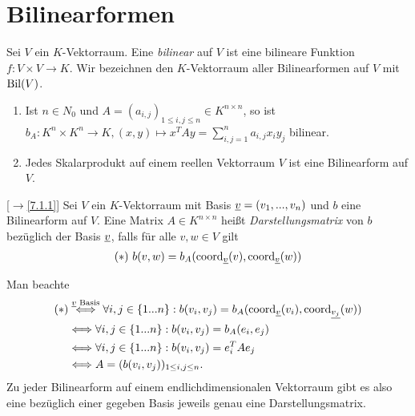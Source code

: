 \documentclass[../../main.tex]{subfiles}
\begin{document}
\section{Bilinearformen}

\begin{df}\label{13.3.1}
Sei $V$ ein $K$-Vektorraum. Eine \emph{bilinear} auf $V$ ist eine bilineare Funktion $f: V\times V\to K$. Wir bezeichnen den $K$-Vektorraum aller Bilinearformen auf $V$ mit $\operatorname{Bil}(V)$.
\end{df}

\begin{bsp}\label{13.3.2}
\begin{enumerate}[\normalfont(a)]
\item Ist $n\in N_0$ und $A=(a_{i,j})_{1\le i,j\le n}\in K^{n\times n}$, so ist $b_A: K^n\times K^n\to K, (x,y)\mapsto x^TAy=\sum_{i,j=1}^na_{i,j}x_iy_j$ bilinear.
\item Jedes Skalarprodukt auf einem reellen Vektorraum $V$ ist eine Bilinearform auf $V$.
\end{enumerate}
\end{bsp}
	
\begin{df}\label{13.3.3} 
[$\to$\ref{7.1.1}] Sei $V$ ein $K$-Vektorraum mit Basis ${\underline v}=(v_1,...,v_n)$ und $b$ eine Bilinearform auf $V$. Eine Matrix $A\in K^{n\times n}$ heißt \emph{Darstellungsmatrix} von $b$ bezüglich der Basis ${\underline v}$, falls für alle $v,w\in V$ gilt
\begin{align*}
(*)\ b(v,w)=b_A(\operatorname{coord}_{{\underline v}}(v),\operatorname{coord}_{{\underline v}}(w))
\end{align*}
\end{df}

\begin{bem}\label{13.3.4} 
Man beachte
\begin{align*}
(*)&\stackrel{\underline{v}\text{ Basis}}{\Longleftrightarrow} \forall i,j\in \{1...n\}: b(v_i,v_j)=b_A(\operatorname{coord}_{\underline{v}}(v_i),\operatorname{coord}_{\underline{v_j}}(w))\\
&\Longleftrightarrow \forall i,j\in \{1...n\}: b(v_i,v_j)=b_A(e_i,e_j)\\
&\Longleftrightarrow \forall i,j\in \{1...n\}: b(v_i,v_j)=e_i^TAe_j\\
&\Longleftrightarrow A=(b(v_i,v_j))_{1\le i,j\le n}.
\end{align*}
Zu jeder Bilinearform auf einem endlichdimensionalen Vektorraum gibt es also eine bezüglich einer gegeben Basis jeweils genau eine Darstellungsmatrix.
\end{bem}
	
\end{document}

